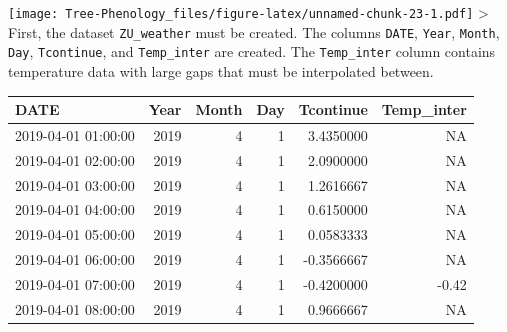 \documentclass[
]{book}
\newenvironment{Shaded}{\begin{snugshade}}{\end{snugshade}}
\newcommand{\DataTypeTok}[1]{\textcolor[rgb]{0.13,0.29,0.53}{#1}}
\newcommand{\DecValTok}[1]{\textcolor[rgb]{0.00,0.00,0.81}{#1}}
\newcommand{\KeywordTok}[1]{\textcolor[rgb]{0.13,0.29,0.53}{\textbf{#1}}}
\newcommand{\NormalTok}[1]{#1}
\newcommand{\OperatorTok}[1]{\textcolor[rgb]{0.81,0.36,0.00}{\textbf{#1}}}
\newcommand{\StringTok}[1]{\textcolor[rgb]{0.31,0.60,0.02}{#1}}
\begin{document}
\texttt{[image: Tree-Phenology\_files/figure-latex/unnamed-chunk-23-1.pdf]}
\textgreater{}
First, the dataset \texttt{ZU\_weather} must be created. The columns \texttt{DATE}, \texttt{Year}, \texttt{Month}, \texttt{Day}, \texttt{Tcontinue}, and \texttt{Temp\_inter} are created. The \texttt{Temp\_inter} column contains temperature data with large gaps that must be interpolated between.

\begin{Shaded}
\end{Shaded}

\begingroup\fontsize{10}{12}\selectfont

\begin{tabular}{l|r|r|r|r|r}
\hline
DATE & Year & Month & Day & Tcontinue & Temp\_inter\\
\hline
2019-04-01 01:00:00 & 2019 & 4 & 1 & 3.4350000 & NA\\
\hline
2019-04-01 02:00:00 & 2019 & 4 & 1 & 2.0900000 & NA\\
\hline
2019-04-01 03:00:00 & 2019 & 4 & 1 & 1.2616667 & NA\\
\hline
2019-04-01 04:00:00 & 2019 & 4 & 1 & 0.6150000 & NA\\
\hline
2019-04-01 05:00:00 & 2019 & 4 & 1 & 0.0583333 & NA\\
\hline
2019-04-01 06:00:00 & 2019 & 4 & 1 & -0.3566667 & NA\\
\hline
2019-04-01 07:00:00 & 2019 & 4 & 1 & -0.4200000 & -0.42\\
\hline
2019-04-01 08:00:00 & 2019 & 4 & 1 & 0.9666667 & NA\\
\hline
\end{tabular}
\endgroup{}
\end{document}
